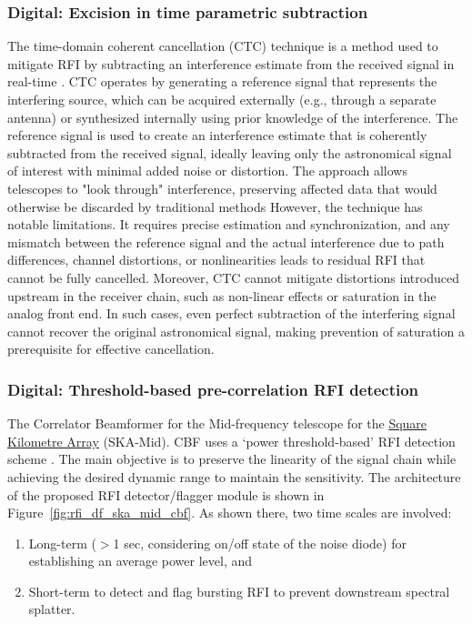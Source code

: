 \subsubsection{Digital: Excision in time parametric subtraction}

The time-domain coherent cancellation (CTC) technique is a method used to mitigate RFI by subtracting an interference estimate from the received signal in real-time \citep{ellingson2022coherent}. CTC operates by generating a reference signal that represents the interfering source, which can be acquired externally (e.g., through a separate antenna) or synthesized internally using prior knowledge of the interference. The reference signal is used to create an interference estimate that is coherently subtracted from the received signal, ideally leaving only the astronomical signal of interest with minimal added noise or distortion. The approach allows telescopes to "look through" interference, preserving affected data that would otherwise be discarded by traditional methods
However, the technique has notable limitations. It requires precise estimation and synchronization, and any mismatch between the reference signal and the actual interference due to path differences, channel distortions, or nonlinearities leads to residual RFI that cannot be fully cancelled. Moreover, CTC cannot mitigate distortions introduced upstream in the receiver chain, such as non-linear effects or saturation in the analog front end. In such cases, even perfect subtraction of the interfering signal cannot recover the original astronomical signal, making prevention of saturation a prerequisite for effective cancellation.

\subsubsection{Digital: Threshold-based pre-correlation RFI detection}
\label{subsection:hardware:catalog:ska-mid}

The Correlator Beamformer for the Mid-frequency telescope for the \href{https://www.skao.int/en}{Square Kilometre Array} (SKA-Mid). CBF uses a `power threshold-based' RFI detection scheme \citep{ska_mid_cbf_rfi_2019}. The main objective is to preserve the linearity of the signal chain while achieving the desired dynamic range to maintain the sensitivity. The architecture of the proposed RFI detector/flagger module is shown in Figure~\ref{fig:rfi_df_ska_mid_cbf}. As shown there, two time scales are involved:
\begin{enumerate}
    \item Long-term ($>$1 sec, considering on/off state of the noise diode) for establishing an average power level, and
    \item Short-term to detect and flag bursting RFI to prevent downstream spectral splatter.
\end{enumerate}

